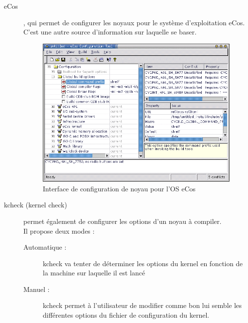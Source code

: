 \documentclass[17pts]{report}
\begin{document}
\begin{description}
\begin{figure}[H]
        \end{figure}
    \item[eCos], qui permet de configurer les noyaux pour le système
        d’exploitation eCos. C’est une autre source d’information
        sur laquelle se baser. \\
        \begin{figure}[H]
            \includegraphics[scale=1.2]{illustrations/eCos_config.png}
            \centering
            \caption{Interface de configuration de noyau pour l'OS eCos}
            \label{fig:InterfaceEcos}
        \end{figure}
        \pagebreak
    \item[kcheck (kernel check)] permet également de configurer les options
        d’un noyau à compiler. \\
        Il propose deux modes : \\
    \begin{description}
        \item[Automatique :] kcheck va tenter de déterminer les options du kernel
            en fonction de la machine sur laquelle il est lancé
        \item[Manuel :] kcheck permet à l’utilisateur de modifier comme bon lui
            semble les différentes options du fichier de configuration du kernel.
    \end{description}
        \begin{figure}[H]

\end{figure}
\end{description}
\end{document}
